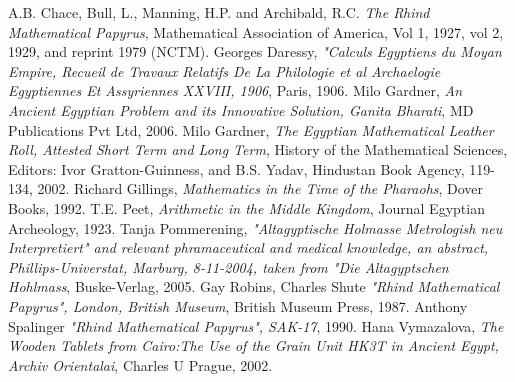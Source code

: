 \documentclass[12pt]{article}
\begin{document}
\begin{thebibliography}{10}

A.B. Chace, Bull, L., Manning, H.P. and Archibald, R.C. \emph{The Rhind Mathematical Papyrus}, Mathematical Association of America, Vol 1, 1927, vol 2, 1929, and reprint 1979 (NCTM).
 Georges Daressy, \emph{"Calculs Egyptiens du Moyan Empire, Recueil de Travaux Relatifs  De La  Philologie et al Archaelogie Egyptiennes Et Assyriennes XXVIII, 1906}, Paris, 1906.
 Milo Gardner, \emph{An Ancient Egyptian Problem and its Innovative Solution, Ganita Bharati}, MD Publications Pvt Ltd, 2006.
 Milo Gardner, \emph{The Egyptian Mathematical Leather Roll, Attested Short Term and Long Term}, History of the Mathematical Sciences, Editors: Ivor Gratton-Guinness, and B.S. Yadav, Hindustan Book Agency, 119-134, 2002.
Richard Gillings, \emph{Mathematics in the Time of the Pharaohs}, Dover Books, 1992.
 T.E. Peet, \emph{Arithmetic in the Middle Kingdom}, Journal Egyptian Archeology, 1923.
 Tanja Pommerening, \emph{"Altagyptische Holmasse Metrologish neu Interpretiert" and relevant phramaceutical and medical knowledge, an abstract,  Phillips-Universtat, Marburg, 8-11-2004, taken from "Die Altagyptschen Hohlmass}, Buske-Verlag, 2005.
 Gay Robins, Charles Shute \emph{"Rhind Mathematical Papyrus", London, British Museum}, British Museum Press, 1987.
 Anthony Spalinger \emph{"Rhind Mathematical Papyrus", SAK-17}, 1990.
 Hana Vymazalova, \emph{The Wooden Tablets from Cairo:The Use of the Grain Unit HK3T in Ancient Egypt, Archiv Orientalai}, Charles U Prague, 2002.
\end{thebibliography}


\end{document}
